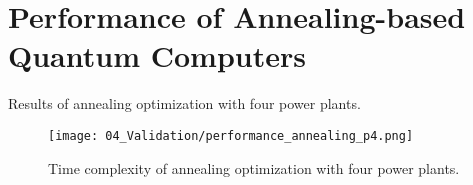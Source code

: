 \section{Performance of Annealing-based Quantum Computers}


\begin{table}
  \centering
  
  \caption{Results of annealing optimization with four power plants.}
  \label{table:validation.annealing.performance}
\end{table}

\begin{figure}[ht]
  \centering
  \texttt{[image: 04\_Validation/performance\_annealing\_p4.png]}
  \caption{Time complexity of annealing optimization with four power plants.}
  \label{figure:validation.annealing.performance}
\end{figure}
